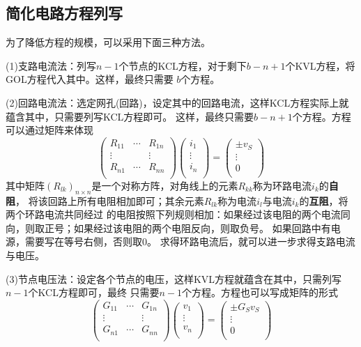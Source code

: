     \subsection{简化电路方程列写}
    \par 为了降低方程的规模，可以采用下面三种方法。
    \par (1)支路电流法：列写$n-1$个节点的KCL方程，对于剩下$b-n+1$个KVL方程，将GOL方程代入其中。这样，最终只需要
        $b$个方程。
    \par (2)回路电流法：选定网孔(回路)，设定其中的回路电流，这样KCL方程实际上就蕴含其中，只需要列写KCL方程即可。
    这样，最终只需要$b-n+1$个方程。方程可以通过矩阵来体现
    \[
    \begin{pmatrix}
        R_{11} & \cdots & R_{1n} \\
        \vdots & & \vdots \\
        R_{n1} & \cdots & R_{nn} \\
    \end{pmatrix}
    \begin{pmatrix}
        i_{1}\\
        \vdots\\
        i_{n}\\
    \end{pmatrix}
    =
    \begin{pmatrix}
        \pm v_{S}\\
        \vdots\\
        0\\
    \end{pmatrix}
    \]
    其中矩阵$(R_{lk})_{n\times n}$是一个对称方阵，对角线上的元素$R_{kk}$称为环路电流$i_k$的\textbf{自阻}，
    将该回路上所有电阻相加即可；其余元素$R_{lk}$称为电流$i_l$与电流$i_k$的\textbf{互阻}，将两个环路电流共同经过
    的电阻按照下列规则相加：如果经过该电阻的两个电流同向，则取正号；如果经过该电阻的两个电阻反向，则取负号。
    如果回路中有电源，需要写在等号右侧，否则取0。
    求得环路电流后，就可以进一步求得支路电流与电压。
    \par (3)节点电压法：设定各个节点的电压，这样KVL方程就蕴含在其中，只需列写$n-1$个KCL方程即可，最终
    只需要$n-1$个方程。方程也可以写成矩阵的形式
    \[
    \begin{pmatrix}
        G_{11} & \cdots & G_{1n} \\
        \vdots & & \vdots \\
        G_{n1} & \cdots & G_{nn} \\
    \end{pmatrix}
    \begin{pmatrix}
        v_{1}\\
        \vdots\\
        v_{n}\\
    \end{pmatrix}
    =
    \begin{pmatrix}
        \pm G_Sv_S\\
        \vdots\\
        0\\
    \end{pmatrix}
    \]
